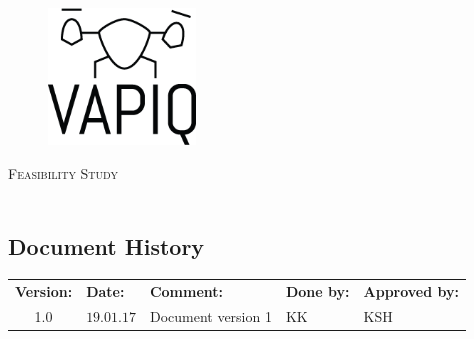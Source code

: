 \documentclass{article}
\author{Aleksander Holthe  \\ Katrine Sundal Haune \\ Kent Kjeldaas \\ Stian Fredriksen \\ Tomas Lyngroth \\ Vanja Katinka Halvorsen}
\makeatletter
\let\vapiqteam\@author
\makeatother
\begin{document}
\begin{titlepage}
    \centering
    \pagecolor{gainsboro}
	\\[3.0 cm]
    \begin{figure}[h]
        \centering
        \includegraphics[width = 0.35\textwidth]{VAPIQ-PICTURES//Logo2_Tilted.png}
        \\[2.0 cm] 
    \end{figure}                              
    \textsc{\Huge Feasibility Study}  
    \\[1 cm]
    \textsc{\Large}   
    \\[3.0 cm]
	\large \vapiqteam      
\end{titlepage}
\pagecolor{white}


\begin{center}
\section*{\textbf{Document History}}
\begin{tabular}{cllll}
\rowcolor{cadetgrey}
\textbf{Version:}    &\textbf{Date:} 	 &\textbf{Comment:}    &\textbf{Done by:}   &\textbf{Approved by:}  \\
1.0       & $19.01.17$   & Document version 1  & KK    & KSH   

\end{tabular}                     


\end{center}
\end{document}
